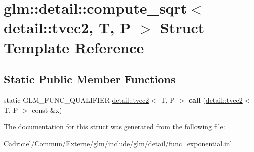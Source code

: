 \hypertarget{structglm_1_1detail_1_1compute__sqrt_3_01detail_1_1tvec2_00_01_t_00_01_p_01_4}{}\section{glm\+:\+:detail\+:\+:compute\+\_\+sqrt$<$ detail\+:\+:tvec2, T, P $>$ Struct Template Reference}
\label{structglm_1_1detail_1_1compute__sqrt_3_01detail_1_1tvec2_00_01_t_00_01_p_01_4}
\subsection*{Static Public Member Functions}
\begin{DoxyCompactItemize}
\item 
static G\+L\+M\+\_\+\+F\+U\+N\+C\+\_\+\+Q\+U\+A\+L\+I\+F\+I\+ER \hyperlink{structglm_1_1detail_1_1tvec2}{detail\+::tvec2}$<$ T, P $>$ {\bfseries call} (\hyperlink{structglm_1_1detail_1_1tvec2}{detail\+::tvec2}$<$ T, P $>$ const \&x)\hypertarget{structglm_1_1detail_1_1compute__sqrt_3_01detail_1_1tvec2_00_01_t_00_01_p_01_4_aa1063e71bb3144910901a224d41d88f7}{}\label{structglm_1_1detail_1_1compute__sqrt_3_01detail_1_1tvec2_00_01_t_00_01_p_01_4_aa1063e71bb3144910901a224d41d88f7}

\end{DoxyCompactItemize}


The documentation for this struct was generated from the following file\+:\begin{DoxyCompactItemize}
\item 
Cadriciel/\+Commun/\+Externe/glm/include/glm/detail/func\+\_\+exponential.\+inl\end{DoxyCompactItemize}
